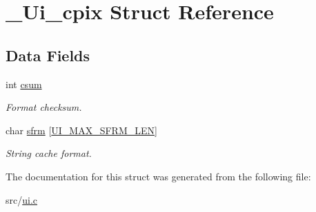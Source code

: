 \hypertarget{struct__Ui__cpix}{}\section{\+\_\+\+Ui\+\_\+cpix Struct Reference}
\label{struct__Ui__cpix}
\subsection*{Data Fields}
\begin{DoxyCompactItemize}
\item 
\mbox{\label{struct__Ui__cpix_ab07eb60dfd57cf3b0323dcdec7945832}} 
int \hyperlink{struct__Ui__cpix_ab07eb60dfd57cf3b0323dcdec7945832}{csum}
\begin{DoxyCompactList}\small\item\em Format checksum. \end{DoxyCompactList}\item 
\mbox{\label{struct__Ui__cpix_a6d44491b5ed84ac881de85d43625c4cf}} 
char \hyperlink{struct__Ui__cpix_a6d44491b5ed84ac881de85d43625c4cf}{sfrm} \mbox{[}\hyperlink{ui_8c_aa491d6f223cbad9e34fff4c5e09efd1d}{U\+I\+\_\+\+M\+A\+X\+\_\+\+S\+F\+R\+M\+\_\+\+L\+EN}\mbox{]}
\begin{DoxyCompactList}\small\item\em String cache format. \end{DoxyCompactList}\end{DoxyCompactItemize}


The documentation for this struct was generated from the following file\+:\begin{DoxyCompactItemize}
\item 
src/\hyperlink{ui_8c}{ui.\+c}\end{DoxyCompactItemize}
